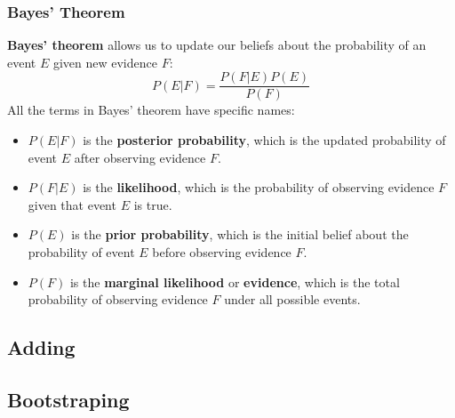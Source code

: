 \subsubsection{Bayes' Theorem}
\textbf{Bayes' theorem} allows us to update our beliefs about the probability of an event $E$ given new evidence $F$:
\begin{equation}
    P(E|F) = \frac{P(F|E) P(E)}{P(F)}
\end{equation}
All the terms in Bayes' theorem have specific names:
\begin{itemize}
    \item $P(E|F)$ is the \textbf{posterior probability}, which is the updated probability of event $E$ after observing evidence $F$.
    \item $P(F|E)$ is the \textbf{likelihood}, which is the probability of observing evidence $F$ given that event $E$ is true.
    \item $P(E)$ is the \textbf{prior probability}, which is the initial belief about the probability of event $E$ before observing evidence $F$.
    \item $P(F)$ is the \textbf{marginal likelihood} or \textbf{evidence}, which is the total probability of observing evidence $F$ under all possible events.
\end{itemize}

\subsection{Adding}

\subsection{Bootstraping}